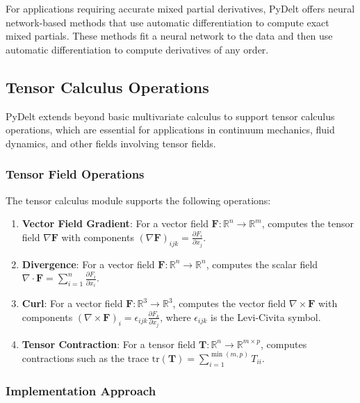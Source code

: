 \documentclass[11pt,a4paper]{article}
\begin{document}
For applications requiring accurate mixed partial derivatives, PyDelt offers neural network-based methods that use automatic differentiation to compute exact mixed partials. These methods fit a neural network to the data and then use automatic differentiation to compute derivatives of any order.

\subsection{Tensor Calculus Operations}

PyDelt extends beyond basic multivariate calculus to support tensor calculus operations, which are essential for applications in continuum mechanics, fluid dynamics, and other fields involving tensor fields.

\subsubsection{Tensor Field Operations}

The tensor calculus module supports the following operations:

\begin{enumerate}
    \item \textbf{Vector Field Gradient}: For a vector field $\mathbf{F}: \mathbb{R}^n \rightarrow \mathbb{R}^m$, computes the tensor field $\nabla \mathbf{F}$ with components $(\nabla \mathbf{F})_{ijk} = \frac{\partial F_i}{\partial x_j}$.
    
    \item \textbf{Divergence}: For a vector field $\mathbf{F}: \mathbb{R}^n \rightarrow \mathbb{R}^n$, computes the scalar field $\nabla \cdot \mathbf{F} = \sum_{i=1}^{n} \frac{\partial F_i}{\partial x_i}$.
    
    \item \textbf{Curl}: For a vector field $\mathbf{F}: \mathbb{R}^3 \rightarrow \mathbb{R}^3$, computes the vector field $\nabla \times \mathbf{F}$ with components $(\nabla \times \mathbf{F})_i = \epsilon_{ijk} \frac{\partial F_k}{\partial x_j}$, where $\epsilon_{ijk}$ is the Levi-Civita symbol.
    
    \item \textbf{Tensor Contraction}: For a tensor field $\mathbf{T}: \mathbb{R}^n \rightarrow \mathbb{R}^{m \times p}$, computes contractions such as the trace $\text{tr}(\mathbf{T}) = \sum_{i=1}^{\min(m,p)} T_{ii}$.
\end{enumerate}

\subsubsection{Implementation Approach}
\end{document}
